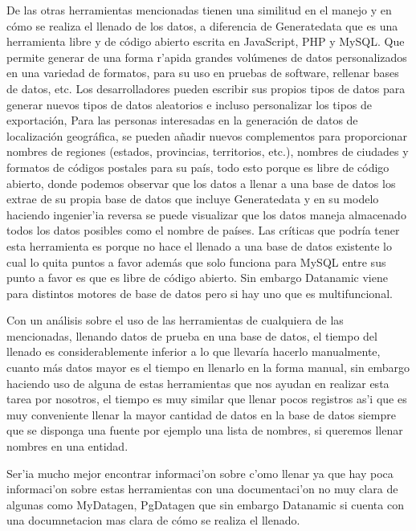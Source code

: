 De las otras herramientas mencionadas tienen una similitud en el manejo y en c\'omo se realiza el llenado de los datos, a diferencia de Generatedata que es una herramienta libre y de c\'odigo abierto escrita en JavaScript, PHP y MySQL. Que permite generar de una forma r'apida grandes vol\'umenes de datos personalizados en una variedad de formatos, para su uso en pruebas de software, rellenar bases de datos, etc. Los desarrolladores pueden escribir sus propios tipos de datos para generar nuevos tipos de datos aleatorios e incluso personalizar los tipos de exportaci\'on, Para las personas interesadas en la generaci\'on de datos de localizaci\'on geogr\'afica, se pueden a\~nadir nuevos complementos para proporcionar nombres de regiones (estados, provincias, territorios, etc.), nombres de ciudades y formatos de c\'odigos postales para su pa\'is, todo esto porque es libre de c\'odigo abierto, donde podemos observar que los datos a llenar a una base de datos los extrae de su propia base de datos que incluye Generatedata y en su modelo haciendo ingenier'ia reversa se puede visualizar que los datos maneja almacenado todos los datos posibles como el nombre de pa\'ises. Las cr\'iticas que podr\'ia tener esta herramienta es porque no hace el llenado a una base de datos existente lo cual lo quita puntos a favor adem\'as que solo funciona para MySQL entre sus punto a favor es que es libre de c\'odigo abierto. Sin embargo Datanamic viene para distintos motores de base de datos pero si hay uno que es multifuncional.

Con un an\'alisis sobre el uso de las herramientas de cualquiera de las mencionadas, llenando datos de prueba en una base de datos, el tiempo del llenado es considerablemente inferior a lo que llevar\'ia hacerlo manualmente, cuanto m\'as datos mayor es el tiempo en llenarlo en la forma manual, sin embargo haciendo uso de alguna de estas herramientas que nos ayudan en realizar esta tarea por nosotros, el tiempo es muy similar que llenar pocos registros as'i que es muy conveniente llenar la mayor cantidad de datos en la base de datos siempre que se disponga una fuente por ejemplo una lista de nombres, si queremos llenar nombres en una entidad. 

Ser'ia mucho mejor encontrar informaci'on sobre c'omo llenar ya que hay poca informaci'on sobre estas herramientas con una documentaci'on no muy clara de algunas como MyDatagen, PgDatagen que sin embargo Datanamic si cuenta con una documnetacion mas clara \cite{datanamictutorial} de c\'omo se realiza el llenado. 

